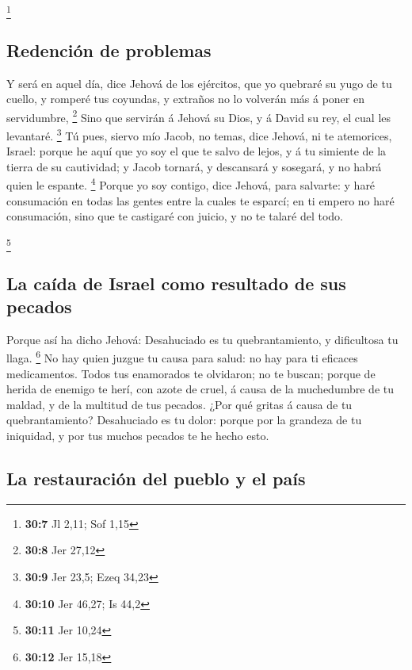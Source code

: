 \footnote{\textbf{30:7} Jl 2,11; Sof 1,15}

\hypertarget{redenciuxf3n-de-problemas}{%
\subsection{Redención de problemas}\label{redenciuxf3n-de-problemas}}

 Y será en aquel día, dice Jehová de los ejércitos, que yo
quebraré su yugo de tu cuello, y romperé tus coyundas, y extraños no lo
volverán más á poner en servidumbre, \footnote{\textbf{30:8} Jer 27,12}
 Sino que servirán á Jehová su Dios, y á David su rey, el
cual les levantaré. \footnote{\textbf{30:9} Jer 23,5; Ezeq 34,23}
 Tú pues, siervo mío Jacob, no temas, dice Jehová, ni te
atemorices, Israel: porque he aquí que yo soy el que te salvo de lejos,
y á tu simiente de la tierra de su cautividad; y Jacob tornará, y
descansará y sosegará, y no habrá quien le espante. \footnote{\textbf{30:10}
  Jer 46,27; Is 44,2}  Porque yo soy contigo, dice Jehová,
para salvarte: y haré consumación en todas las gentes entre la cuales te
esparcí; en ti empero no haré consumación, sino que te castigaré con
juicio, y no te talaré del todo.

\footnote{\textbf{30:11} Jer 10,24}

\hypertarget{la-cauxedda-de-israel-como-resultado-de-sus-pecados}{%
\subsection{La caída de Israel como resultado de sus
pecados}\label{la-cauxedda-de-israel-como-resultado-de-sus-pecados}}

 Porque así ha dicho Jehová: Desahuciado es tu
quebrantamiento, y dificultosa tu llaga. \footnote{\textbf{30:12} Jer
  15,18}  No hay quien juzgue tu causa para salud: no hay
para ti eficaces medicamentos.  Todos tus enamorados te
olvidaron; no te buscan; porque de herida de enemigo te herí, con azote
de cruel, á causa de la muchedumbre de tu maldad, y de la multitud de
tus pecados.  ¿Por qué gritas á causa de tu
quebrantamiento? Desahuciado es tu dolor: porque por la grandeza de tu
iniquidad, y por tus muchos pecados te he hecho esto.

\hypertarget{la-restauraciuxf3n-del-pueblo-y-el-pauxeds}{%
\subsection{La restauración del pueblo y el
país}\label{la-restauraciuxf3n-del-pueblo-y-el-pauxeds}}

